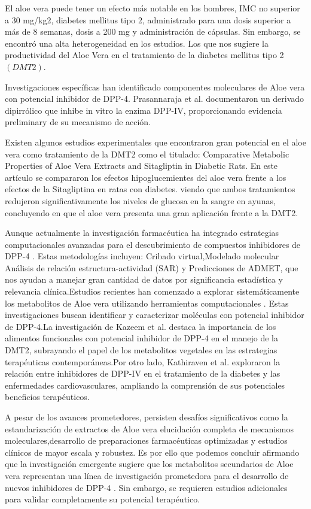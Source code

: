 El aloe vera puede tener un efecto más notable en los hombres, IMC no superior a 30 mg/kg2, diabetes mellitus tipo 2, administrado para una dosis superior a más de 8 semanas, dosis a 200 mg y administración de cápsulas. Sin embargo, se encontró una alta heterogeneidad en los estudios. Los que nos sugiere la productividad del Aloe Vera en el tratamiento de la diabetes mellitus tipo 2 $(DMT2)$.\cite{Ushasree2024,Budiastutik2022}

Investigaciones específicas han identificado componentes moleculares de Aloe vera con potencial inhibidor de DPP-4. Prasannaraja et al. \cite{Prasannaraja2020} documentaron un derivado dipirrólico que inhibe in vitro la enzima DPP-IV, proporcionando evidencia preliminary de su mecanismo de acción.

Existen algunos estudios experimentales que encontraron gran potencial en el aloe vera como tratamiento de la DMT2 como el titulado: Comparative Metabolic Properties of Aloe Vera Extracts and Sitagliptin in Diabetic Rats. En este artículo se compararon los efectos hipoglucemientes del aloe vera frente a los efectos de la Sitagliptina en ratas con diabetes. viendo que ambos tratamientos redujeron significativamente los niveles de glucosa en la sangre en ayunas, concluyendo en que el aloe vera presenta una gran aplicación frente a la DMT2.\cite{Javaid2022}

Aunque actualmente la investigación farmacéutica ha integrado estrategias computacionales avanzadas para el descubrimiento de compuestos inhibidores de DPP-4 \cite{DeLaTorre2024, Lu2023}. Estas metodologías incluyen: Cribado virtual,Modelado molecular
Análisis de relación estructura-actividad (SAR) y Predicciones de ADMET, que nos ayudan a manejar gran cantidad de datos por significancia estadística y relevancia clínica.Estudios recientes han comenzado a explorar sistemáticamente los metabolitos de Aloe vera utilizando herramientas computacionales \cite{Zollapi2023, Suleiman2024}. Estas investigaciones buscan identificar y caracterizar moléculas con potencial inhibidor de DPP-4.La investigación de Kazeem et al. \cite{Kazeem2021} destaca la importancia de los alimentos funcionales con potencial inhibidor de DPP-4 en el manejo de la DMT2, subrayando el papel de los metabolitos vegetales en las estrategias terapéuticas contemporáneas.Por otro lado, Kathiraven et al. \cite{Kathiraven2024} exploraron la relación entre inhibidores de DPP-IV en el tratamiento de la diabetes y las enfermedades cardiovasculares, ampliando la comprensión de sus potenciales beneficios terapéuticos.

A pesar de los avances prometedores, persisten desafíos significativos como la estandarización de extractos de Aloe vera
elucidación completa de mecanismos moleculares,desarrollo de preparaciones farmacéuticas optimizadas y estudios clínicos de mayor escala y robustez. Es por ello que podemos concluir afirmando que la investigación emergente sugiere que los metabolitos secundarios de Aloe vera representan una línea de investigación prometedora para el desarrollo de nuevos inhibidores de DPP-4 \cite{Singhal2024, Shao2024}. Sin embargo, se requieren estudios adicionales para validar completamente su potencial terapéutico.


